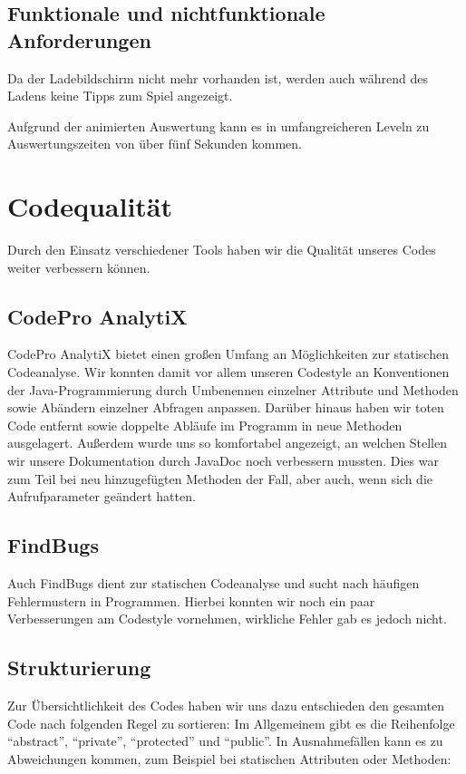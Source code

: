 \documentclass[parskip=full]{scrreprt}
\begin{document}
\section{Funktionale und nichtfunktionale Anforderungen}
\begin{description}
	\item Da der Ladebildschirm nicht mehr vorhanden ist, werden auch während des Ladens keine Tipps zum Spiel angezeigt.
	\item Aufgrund der animierten Auswertung kann es in umfangreicheren Leveln zu Auswertungszeiten von über fünf Sekunden kommen.
\end{description}

\chapter{Codequalität}

Durch den Einsatz verschiedener Tools haben wir die Qualität unseres Codes weiter verbessern können.

\section{CodePro AnalytiX}

CodePro AnalytiX bietet einen großen Umfang an Möglichkeiten zur statischen Codeanalyse. Wir konnten damit vor allem unseren Codestyle an Konventionen der Java-Programmierung durch Umbenennen einzelner Attribute und Methoden sowie Abändern einzelner Abfragen anpassen. Darüber hinaus haben wir toten Code entfernt sowie doppelte Abläufe im Programm in neue Methoden ausgelagert.
Außerdem wurde uns so komfortabel angezeigt, an welchen Stellen wir unsere Dokumentation durch JavaDoc noch verbessern mussten. Dies war zum Teil bei neu hinzugefügten Methoden der Fall, aber auch, wenn sich die Aufrufparameter geändert hatten.

\section{FindBugs}

Auch FindBugs dient zur statischen Codeanalyse und sucht nach häufigen Fehlermustern in Programmen. Hierbei konnten wir noch ein paar Verbesserungen am Codestyle vornehmen, wirkliche Fehler gab es jedoch nicht. 

\section{Strukturierung}
Zur Übersichtlichkeit des Codes haben wir uns dazu entschieden den gesamten Code nach folgenden Regel zu sortieren: \newline
Im Allgemeinem gibt es die Reihenfolge "`abstract"', "`private"', "`protected"' und "`public"'. In Ausnahmefällen kann es zu Abweichungen kommen, zum Beispiel bei statischen Attributen oder Methoden:
\end{document}
